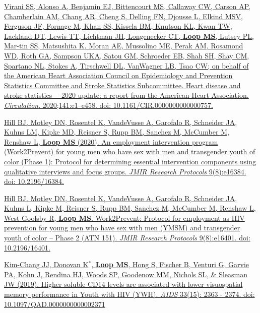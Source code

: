 \documentclass[10pt,letterpaper]{article}
\begin{document}
\begin{etaremune}
\item \href{https://www.ahajournals.org/doi/abs/10.1161/CIR.0000000000000757}{Virani SS, Alonso A, Benjamin EJ, Bittencourt MS, Callaway CW, Carson AP, Chamberlain AM, Chang AR, Cheng S, Delling FN, Djousse L, Elkind MSV, Ferguson JF, Fornage M, Khan SS, Kissela BM, Knutson KL, Kwan TW, Lackland DT, Lewis TT, Lichtman JH, Longenecker CT, \textbf{Loop MS}, Lutsey PL, Mar-tin SS, Matsushita K, Moran AE, Mussolino ME, Perak AM, Rosamond WD, Roth GA, Sampson UKA, Satou GM, Schroeder EB, Shah SH, Shay CM, Spartano NL, Stokes A, Tirschwell DL, VanWagner LB, Tsao CW; on behalf of the American Heart Association Council on Epidemiology and Prevention Statistics Committee and Stroke Statistics Subcommittee. Heart disease and stroke statistics— 2020 update: a report from the American Heart Association. \emph{Circulation}. 2020;141:e1–e458. doi: 10.1161/CIR.0000000000000757.}

\item \href{https://www.researchprotocols.org/2020/8/e16384/}{Hill BJ, Motley DN, Rosentel K, VandeVusse A, Garofalo R, Schneider JA, Kuhns LM, Kipke MD, Reisner S, Rupp BM, Sanchez M, McCumber M, Renshaw L, \textbf{Loop MS} (2020). An employment intervention program (Work2Prevent) for young men who have sex with men and transgender youth of color (Phase 1): Protocol for determining essential intervention components using qualitative interviews and focus groups. \emph{JMIR Research Protocols} 9(8):e16384. doi: 10.2196/16384.}

\item \href{https://www.researchprotocols.org/2020/8/e16401/}{Hill BJ, Motley DN, Rosentel K, VandeVusse A, Garofalo R, Schneider JA, Kuhns L, Kipke M, Reisner S, Rupp BM, Sanchez M, McCumber M, Renshaw L, West Goolsby R, \textbf{Loop MS}. Work2Prevent: Protocol for employment as HIV prevention for young men who have sex with men (YMSM) and transgender youth of color – Phase 2 (ATN 151). \emph{JMIR Research Protocols} 9(8):e16401. doi: 10.2196/16401.}


\item \href{https://journals.lww.com/aidsonline/Fulltext/2019/12010/Higher_soluble_CD14_levels_are_associated_with.9.aspx}{Kim-Chang JJ, Donovan K$^*$, \textbf{Loop MS}, Hong S, Fischer B, Venturi G, Garvie PA, Kohn J, Rendina HJ, Woods SP, Goodenow MM, Nichols SL, \& Sleasman JW (2019). Higher soluble CD14 levels are associated with lower visuospatial memory performance in Youth with HIV (YWH). \emph{AIDS} 33(15): 2363 - 2374. doi: 10.1097/QAD.0000000000002371}




\end{etaremune}
\end{document}
